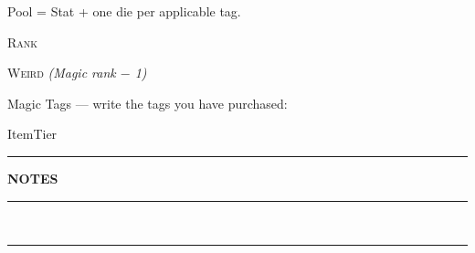 \begin{minipage}[t]{0.31\linewidth}

  {\scriptsize\color{atrRule}Pool = Stat + one die per applicable tag.}
  \par\vspace{2pt}
  {\small\textsc{Rank}}\hspace{3mm}\sheetfourpips
  \par\vspace{4pt}
  {\small\textsc{Weird}}\hspace{3mm}\underline{\hspace{8mm}}
  \hfill{\scriptsize\itshape\color{atrRule}(Magic rank $-$ 1)}
  \par\vspace{6pt}
  {\scriptsize\color{atrRule}Magic Tags — write the tags you have purchased:}
  \par\vspace{4pt}
  \sheettagslot[40mm]\par\vspace{3pt}
  \sheettagslot[40mm]\par\vspace{3pt}
  \sheettagslot[40mm]\par\vspace{3pt}
  \sheettagslot[40mm]\par\vspace{3pt}
  \sheettagslot[40mm]\par\vspace{3pt}
  \sheettagslot[40mm]\par\vspace{3pt}
  \sheettagslot[40mm]\par\vspace{3pt}
  \sheettagslot[40mm]\par\vspace{3pt}
  \sheettagslot[40mm]\par\vspace{3pt}
  \sheettagslot[40mm]
  \par\vspace{6pt}

  {\scriptsize Item\hfill Tier}\par\vspace{2pt}
  \sheetitemrow\sheetitemrow\sheetitemrow\sheetitemrow\sheetitemrow
  \sheetitemrow\sheetitemrow\sheetitemrow

\end{minipage}

\par\vspace{4pt}
{\color{atrRule}\rule{\linewidth}{0.5pt}}\par\vspace{1pt}
{\hdfont\bfseries\footnotesize\color{atrAccent}NOTES}\hspace{4mm}%
\rule{0.85\linewidth}{0.3pt}\\[6pt]
\rule{\linewidth}{0.3pt}
